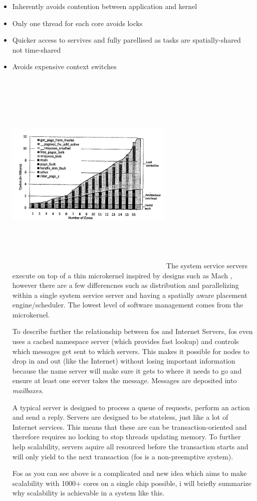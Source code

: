 \documentclass[journal]{IEEEtran}
\begin{document}
\begin{itemize}
\item Inherently avoids contention between application and kernel
\item Only one thread for each core avoids locks
\item Quicker access to servives and fully parellised as tasks are spatially-shared not time-shared
\item Avoids expensive context switches

\vspace{5mm}

\includegraphics[width =8cm, height =10cm]{image.png}
The system service servers execute on top of a thin microkernel inspired by designs such as Mach \cite{Mach}, however there are a few differencnes such as distribution and parallelizing within a single system service server and having a spatially aware placement engine/scheduler. The lowest level of software management comes from the microkernel.

To describe further the relationship between fos and Internet Servers, fos even uses a cached namespace server (which provides fast lookup) and controls which messages get sent to which servers. This makes it possible for nodes to drop in and out (like the Internet) without losing important information because the name server will make sure it gets to where it needs to go and ensure at least one server takes the message. Messages are deposited into \emph{mailboxes}.

A typical server is designed to process a queue of requests, perform an action and send a reply. Servers are designed to be stateless, just like a lot of Internet services. This means that these are can be transaction-oriented and therefore requires no locking to stop threads updating memory. To further help scalability, servers aquire all resourced before the transaction starts and will only yield to the next transaction (fos is a non-preemptive system).

Fos as you can see above is a complicated and new idea which aims to make scalability with 1000+ cores on a single chip possible, i will briefly summarize why scalability is achievable in a system like this.


\end{itemize}
\end{document}
